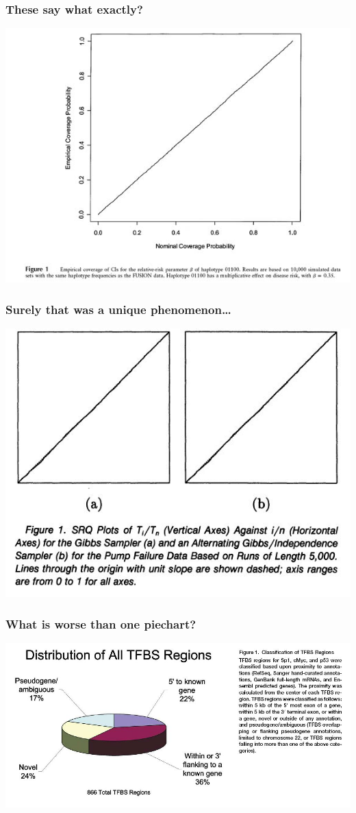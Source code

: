 \documentclass{beamer}
\begin{document}
\begin{frame}
  \frametitle{These say what exactly?}
  \includegraphics[width = \textwidth, keepaspectratio = true]{figure/epstein_fig1}
\end{frame}

\begin{frame}
  \frametitle{Surely that was a unique phenomenon\ldots}
  \includegraphics[width = \textwidth, keepaspectratio = true]{figure/mykland_fig1}
\end{frame}

\begin{frame}
  \frametitle{What is worse than one piechart?}
  \includegraphics[width = \textwidth, keepaspectratio = true]{figure/cawley_fig1}
\end{frame}
\end{document}
